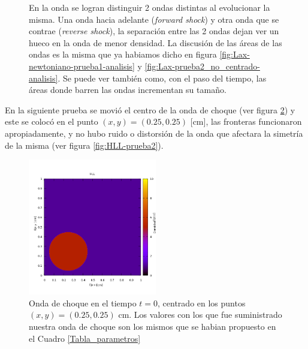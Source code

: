 \documentclass[12pt,a4paper]{book}
\begin{document}
\begin{figure}
\caption{\label{fig:HLL-prueba1-analisis}En la onda se logran distinguir 2 ondas distintas al evolucionar la misma. Una onda hacia adelante (\emph{forward shock}) y otra onda que se contrae (\emph{reverse shock}), la separación entre las 2 ondas dejan ver un hueco en la onda de menor densidad. La discusión de las áreas de las ondas es la misma que ya habiamos dicho en figura \ref{fig:Lax-newtoniano-prueba1-analisis} y \ref{fig:Lax-prueba2_no_centrado-analisis}. Se puede ver también como, con el paso del tiempo, las áreas donde barren las ondas incrementan su tamaño.} 
\end{figure}


En la siguiente prueba se movió el centro de la onda de choque (ver figura \ref{fig:onda_choque4_t_0}) y este se colocó en el punto $(x,y) = (0.25,0.25)$ [cm], las fronteras funcionaron apropiadamente, y no hubo ruido o distorsión de la onda que afectara la simetría de la misma (ver figura \ref{fig:HLL-prueba2}).

\begin{figure}
\centering
\includegraphics[width=0.5\textwidth]{./Figuras/Pruebas/Prueba_onda_choque/onda_choque4_t_0}
\caption{\label{fig:onda_choque4_t_0}Onda de choque en el tiempo $t = 0$, centrado en los puntos $(x,y) = (0.25,0.25)$ cm. Los valores con los que fue suministrado nuestra onda de choque son los mismos que se habian propuesto en el Cuadro \ref{Tabla_parametros} }
\end{figure}
\end{document}
